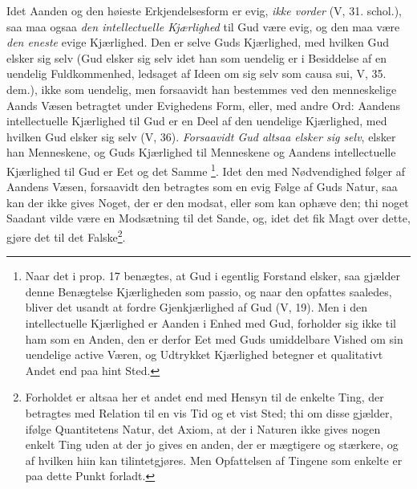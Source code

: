 \documentclass[12pt,a4paper]{book}
\newcommand{\opage}[1]{\marginnote{\footnotesize\textit{[#1]}}}
\begin{document}
Idet Aanden og den høieste Erkjendelsesform er evig,
\emph{ikke vorder} (V, 31. schol.), saa maa ogsaa \emph{den intellectuelle
Kjærlighed} til Gud være evig, og den maa
være \emph{den eneste} evige Kjærlighed. Den er selve Guds
Kjærlighed, med hvilken Gud elsker sig selv (Gud elsker
sig selv idet han som uendelig er i Besiddelse%
 af en uendelig
Fuldkommenhed, ledsaget af Ideen om sig selv som
\opage{169} \setcounter{footnote}{0}%
causa sui, V, 35. dem.), ikke som uendelig, men forsaavidt
han bestemmes ved den menneskelige Aands Væsen betragtet
under Evighedens Form, eller, med andre Ord:
Aandens intellectuelle Kjærlighed til Gud er en Deel af den
uendelige Kjærlighed, med hvilken Gud elsker sig selv (V,
36). \emph{Forsaavidt Gud altsaa elsker sig selv}, elsker
han Menneskene, og Guds Kjærlighed til Menneskene og
Aandens intellectuelle Kjærlighed til Gud er Eet og det
Samme%
\footnote{Naar det i prop. 17 benægtes, at Gud i egentlig Forstand elsker,
saa gjælder denne Benægtelse Kjærligheden som passio, og naar den
opfattes saaledes, bliver det usandt at fordre Gjenkjærlighed af Gud
(V, 19). Men i den intellectuelle Kjærlighed er Aanden i Enhed
med Gud, forholder sig ikke til ham som en Anden, den er derfor
Eet med Guds umiddelbare Vished om sin uendelige active Væren,
og Udtrykket Kjærlighed betegner et qualitativt Andet end paa
hint Sted.}. Idet den med Nødvendighed følger af Aandens
Væsen, forsaavidt den betragtes som en evig Følge af Guds
Natur, saa kan der ikke gives Noget, der er den modsat,
eller som kan ophæve den; thi noget Saadant vilde være
en Modsætning til det Sande, og, idet det fik Magt over
dette, gjøre det til det Falske\footnote{Forholdet er altsaa her et andet end med Hensyn til de enkelte
Ting, der betragtes med Relation til en vis Tid og et vist Sted; thi
om disse gjælder, ifølge Quantitetens Natur, det Axiom, at der i
Naturen ikke gives nogen enkelt Ting uden at der jo gives en anden,
der er mægtigere og stærkere, og af hvilken hiin kan tilintetgjøres.
Men Opfattelsen af Tingene som enkelte er paa dette Punkt
forladt.}.
\end{document}
